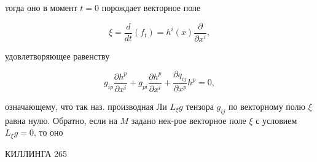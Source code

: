 \documentclass[10pt]{article}
\begin{document}
тогда оно в момент $t=0$ порождает векторное поле



\[

\xi=\frac{d}{d t}\left(f_{t}\right)=h^{i}(x) \frac{\partial}{\partial x^{i}},

\]



удовлетворяющее равенству



\[

g_{i p} \frac{\partial h^{p}}{\partial x^{i}}+g_{p i} \frac{\partial h^{p}}{\partial x^{i}}+\frac{\partial q_{i j}}{\partial x^{p}} h^{p}=0,

\]



означающему, что так наз. производная Ли $L_{\xi} g$ тензора $g_{i j}$ по векторному полю $\xi$ равна нулю. Обратно, если на $M$ задано нек-рое векторное поле $\xi$ с условием $L_{\xi} g=0$, то оно



КИЛЛИНГА 265
\end{document}
